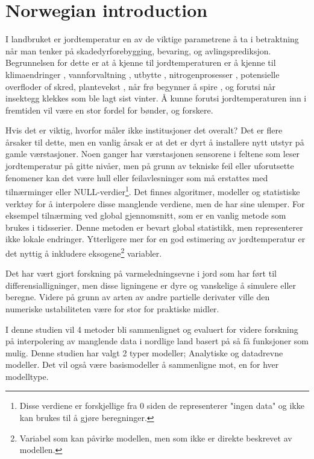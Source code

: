 \section{Norwegian introduction}

I landbruket er jordtemperatur en av de viktige parametrene å ta i betraktning når man tenker på skadedyrforebygging, bevaring, og avlingsprediksjon. Begrunnelsen for dette er at å kjenne til jordtemperaturen er å kjenne til klimaendringer \cite{li_attention-aware_2022}, vannforvaltning \cite{alizamir_advanced_2020}, utbytte \cite{sim_prediction_2020}, nitrogenprosesser \cite{rankinen_simple_2004}, potensielle overfloder of skred\cite{stuurop_influence_2022}, plantevekst \cite{li_modeling_2020}, når frø begynner å spire \cite{li_modeling_2020}, og forutsi når insektegg klekkes som ble lagt sist vinter. Å kunne forutsi jordtemperaturen inn i fremtiden vil være en stor fordel for bønder, og forskere.

Hvis det er viktig, hvorfor måler ikke institusjoner det overalt? Det er flere årsaker til dette, men en vanlig årsak er at det er dyrt å installere nytt utstyr på gamle værstasjoner. Noen ganger har værstasjonen sensorene i feltene som leser jordtemperatur på gitte nivåer, men på grunn av tekniske feil eller uforutsette fenomener kan det være hull eller feilavlesninger som må erstattes med tilnærminger eller NULL-verdier\footnote{Disse verdiene er forskjellige fra 0 siden de representerer "ingen data" og ikke kan brukes til å gjøre beregninger.}. Det finnes algoritmer, modeller og statistiske verktøy for å interpolere disse manglende verdiene, men de har sine ulemper. For eksempel tilnærming ved global gjennomsnitt, som er en vanlig metode som brukes i tidsserier\cite{lepot_interpolation_2017}. Denne metoden er bevart global statistikk, men representerer ikke lokale endringer. Ytterligere mer for en god estimering av jordtemperatur er det nyttig å inkludere eksogene\footnote{Variabel som kan påvirke modellen, men som ikke er direkte beskrevet av modellen.} variabler.

Det har vært gjort forskning på varmeledningsevne i jord som har ført til differensialligninger\cite{karvonen_model_1988}, men disse ligningene\cite{fourier_analytical_2009,karvonen_model_1988} er dyre og vanskelige å simulere eller beregne\cite{rank20_04}. Videre på grunn av arten av andre partielle derivater ville den numeriske ustabiliteten være for stor for praktiske midler.

I denne studien vil 4 metoder bli sammenlignet og evaluert for videre forskning på interpolering av manglende data i nordlige land basert på så få funksjoner som mulig. Denne studien har valgt 2 typer modeller; Analytiske og datadrevne modeller. Det vil også være basismodeller å sammenligne mot, en for hver modelltype.